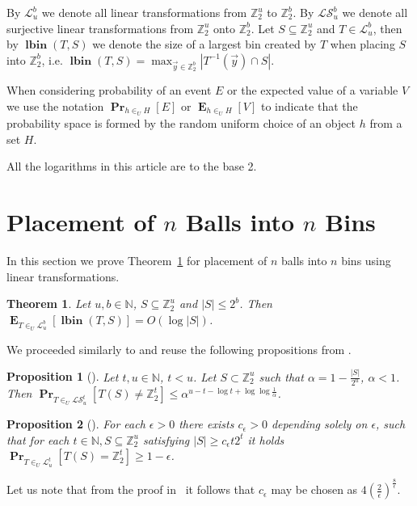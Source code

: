 ﻿\documentclass[review]{elsarticle}
\newcommand{\lbin}[2]{\operatorname{\mathbf{lbin}}({#1}, {#2})}
\newcommand{\vecspace}[2]{\mathbb{Z}_{#1}^{#2}}
\newcommand{\binvecspace}[1]{\vecspace{2}{#1}}
\newcommand{\linearmaps}[2]{\mathcal{L}_{#1}^{#2}}
\newcommand{\surjectivelinearmaps}[2]{\mathcal{LS}_{#1}^{#2}}
\newcommand{\probs}[2]{\operatorname{\mathbf{Pr}}_{{#1}}\left[{#2}\right]}
\newcommand{\expects}[2]{\operatorname{\mathbf{E}}_{{#1}}\left[{#2}\right]}
\newtheorem{theorem}{Theorem}
\newtheorem{proposition}{Proposition}
\begin{document}
By $\linearmaps{u}{b}$ we denote all linear transformations from $\binvecspace{u}$ to $\binvecspace{b}$.
By $\surjectivelinearmaps{u}{b}$ we denote all surjective linear transformations from $\binvecspace{u}$ onto $\binvecspace{b}$.
Let $S \subseteq \binvecspace{u}$ and $T \in \linearmaps{u}{b}$, then by $\lbin{T}{S}$ we denote the size of a largest bin created by $T$ when placing $S$ into $\binvecspace{b}$, i.e. $\lbin{T}{S} = \operatorname{max}_{\vec y \in \binvecspace{b}} |T^{-1}(\vec y) \cap S|$.

When considering probability of an event $E$ or the expected value of a variable $V$ we use the notation $\probs{h \in_U H}{E}$ or $\expects{h \in_U H}{V}$ to indicate that the probability space is formed by the random uniform choice of an object $h$ from a set $H$.

All the logarithms in this article are to the base 2.

\section{Placement of \texorpdfstring{$n$}{n} Balls into \texorpdfstring{$n$}{n} Bins}

In this section we prove Theorem~\ref{theorem-n-to-n} for placement of $n$ balls into $n$ bins using linear transformations.
\begin{theorem}
\label{theorem-n-to-n}
Let $u, b \in \mathbb{N}$, $S \subseteq \binvecspace{u}$ and $|S| \leq 2^b$. Then $\expects{T \in_U \linearmaps{u}{b}}{\lbin{T}{S}} = O(\log |S|)$.
\end{theorem}

We proceeded similarly to \cite{alonetal} and reuse the following propositions from \cite{alonetal}.
\begin{proposition}[{\cite[Theorem~7b, p.~7]{alonetal}}]
\label{proposition-prob-bound}
Let $t, u \in \mathbb{N}$, $t < u$.
Let $S \subset \binvecspace{u}$ such that $\alpha = 1 - \frac{|S|}{2^u}$, $\alpha < 1$.
Then $\probs{T \in_U \surjectivelinearmaps{u}{t}}{T(S) \neq \binvecspace{t}} \leq \alpha^{u - t - \log t + \log \log \frac{1}{\alpha}}$.
\end{proposition}

\begin{proposition}[{\cite[Theorem~{7a}, p.~7]{alonetal}}]
\label{proposition-epsilon}
For each $\epsilon > 0$ there exists $c_\epsilon > 0$ depending solely on $\epsilon$, such that for each $t \in \mathbb{N}, S \subseteq \binvecspace{u}$ satisfying $|S| \geq c_\epsilon t 2^t$ it holds $\probs{T \in_U \linearmaps{u}{t}}{T(S) = \binvecspace{t}} \geq 1 - \epsilon$.
\end{proposition}
Let us note that from the proof in~\cite{alonetal} it follows that $c_\epsilon$ may be chosen as $4\left(\frac{2}{\epsilon}\right)^{\frac{8}{\epsilon}}$.
\end{document}
